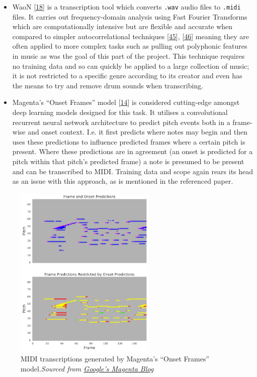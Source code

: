 \documentclass[12pt,]{article}
\providecommand{\tightlist}{%
  \setlength{\itemsep}{0pt}\setlength{\parskip}{0pt}}
\begin{document}
\begin{itemize}
\tightlist
\item
  WaoN {[}\protect\hyperlink{ref-waon}{18}{]} is a transcription tool
  which converts \texttt{.wav} audio files to \texttt{.midi} files. It
  carries out frequency-domain analysis using Fast Fourier Transforms
  which are computationally intensive but are flexible and accurate when
  compared to simpler autocorrelational techniques
  {[}\protect\hyperlink{ref-klapuri2004automatic}{45}{]},
  {[}\protect\hyperlink{ref-gerhard2003pitch}{46}{]} meaning they are
  often applied to more complex tasks such as pulling out polyphonic
  features in music as was the goal of this part of the project. This
  technique requires no training data and so can quickly be applied to a
  large collection of music; it is not restricted to a specific genre
  according to its creator and even has the means to try and remove drum
  sounds when transcribing.
\item
  Magenta's ``Onset Frames'' model
  {[}\protect\hyperlink{ref-hawthorne2017onsets}{14}{]} is considered
  cutting-edge amongst deep learning models designed for this task. It
  utilises a convolutional recurrent neural network architecture to
  predict pitch events both in a frame-wise and onset context. I.e. it
  first predicts where notes may begin and then uses these predictions
  to influence predicted frames where a certain pitch is present. Where
  these predictions are in agreement (an onset is predicted for a pitch
  within that pitch's predicted frame) a note is presumed to be present
  and can be transcribed to MIDI. Training data and scope again rears
  its head as an issue with this approach, as is mentioned in the
  referenced paper.
\end{itemize}

\begin{figure}
\centering
\includegraphics[width=0.6\textwidth,height=\textheight]{Images/frames.png}
\caption{MIDI transcriptions generated by Magenta's ``Onset Frames''
model.\newline\textit{Sourced from \href{https://magenta.tensorflow.org/onsets-frames}{Google's Magenta Blog}}}
\end{figure}
\end{document}
